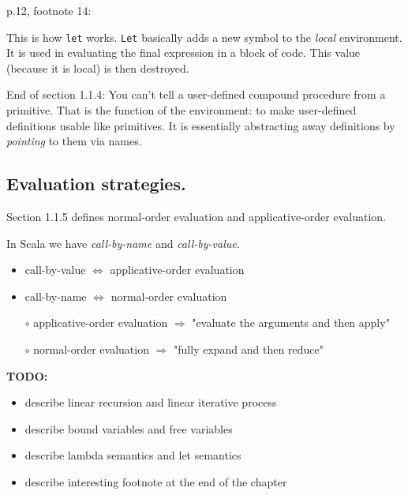 \documentclass{article}
\begin{document}
\noindent
p.12, footnote 14: 

	This is how \texttt{let} works. \texttt{Let} basically adds a new symbol
	to the \textit{local} environment. It is used in evaluating the
	final expression in a block of code. This value	
	(because it is local) is then destroyed.

\noindent
End of section 1.1.4:
	You can't tell a user-defined compound procedure from a primitive.
	That is the function of the environment: to make user-defined 
	definitions usable like primitives. It is essentially
	abstracting away definitions by \textit{pointing} to them via names.

\subsection*{Evaluation strategies.}

Section 1.1.5 defines normal-order evaluation and applicative-order evaluation.

\noindent
In Scala we have \textit{call-by-name} and \textit{call-by-value}.

\begin{itemize}
    \item call-by-value $\Longleftrightarrow$ applicative-order evaluation
    \item call-by-name $\Longleftrightarrow$ normal-order evaluation
\end{itemize}

\begin{itemize}
    \item[$\circ$] applicative-order evaluation $\Rightarrow$ "evaluate the arguments and then apply"
    \item[$\circ$] normal-order evaluation $\Rightarrow$ "fully expand and then reduce"
\end{itemize}

\noindent
\textbf{TODO:}
\begin{itemize}
    \item describe linear recursion and linear iterative process
    \item describe bound variables and free variables
    \item describe lambda semantics and let semantics
    \item describe interesting footnote at the end of the chapter
\end{itemize}
\end{document}
